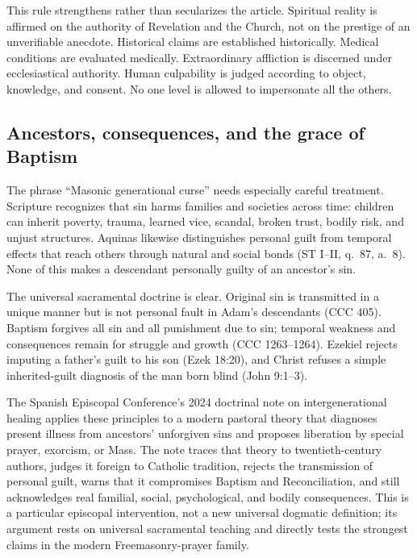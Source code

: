 This rule strengthens rather than secularizes the article.  Spiritual reality is affirmed on the authority of Revelation and the Church, not on the prestige of an unverifiable anecdote.  Historical claims are established historically.  Medical conditions are evaluated medically.  Extraordinary affliction is discerned under ecclesiastical authority.  Human culpability is judged according to object, knowledge, and consent.  No one level is allowed to impersonate all the others.

\subsection{Ancestors, consequences, and the grace of Baptism}

The phrase ``Masonic generational curse'' needs especially careful treatment.  Scripture recognizes that sin harms families and societies across time: children can inherit poverty, trauma, learned vice, scandal, broken trust, bodily risk, and unjust structures.  Aquinas likewise distinguishes personal guilt from temporal effects that reach others through natural and social bonds (ST I--II, q.~87, a.~8).  None of this makes a descendant personally guilty of an ancestor's sin.

The universal sacramental doctrine is clear.  Original sin is transmitted in a unique manner but is not personal fault in Adam's descendants (CCC 405).  Baptism forgives all sin and all punishment due to sin; temporal weakness and consequences remain for struggle and growth (CCC 1263--1264).  Ezekiel rejects imputing a father's guilt to his son (Ezek 18:20), and Christ refuses a simple inherited-guilt diagnosis of the man born blind (John 9:1--3).

The Spanish Episcopal Conference's 2024 doctrinal note on intergenerational healing applies these principles to a modern pastoral theory that diagnoses present illness from ancestors' unforgiven sins and proposes liberation by special prayer, exorcism, or Mass.  The note traces that theory to twentieth-century authors, judges it foreign to Catholic tradition, rejects the transmission of personal guilt, warns that it compromises Baptism and Reconciliation, and still acknowledges real familial, social, psychological, and bodily consequences.  This is a particular episcopal intervention, not a new universal dogmatic definition; its argument rests on universal sacramental teaching and directly tests the strongest claims in the modern Freemasonry-prayer family.

